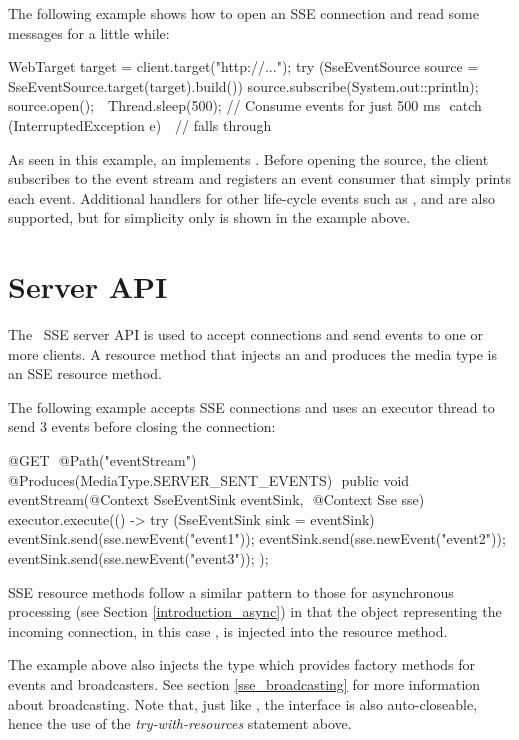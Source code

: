 The following example shows how to open an SSE connection and read some messages for a little
while:

\begin{listing}{1}
  WebTarget target = client.target("http://...");
  try (SseEventSource source = SseEventSource.target(target).build()) {
	source.subscribe(System.out::println);
	source.open();  
	Thread.sleep(500); 		// Consume events for just 500 ms 
  } catch (InterruptedException e) { 
	// falls through 
  }
\end{listing}

As seen in this example, an  implements . Before opening the source, the client subscribes to the event stream and registers an event consumer that simply prints each event. Additional handlers for other life-cycle events such as ,  and  are also supported, but for simplicity only  is shown in the example above.

\section{Server API}
\label{sse_server_api}

The \jaxrs\ SSE server API is used to accept connections and send events to one or more clients. A resource method that injects an  and produces the media type  is an SSE resource method.

The following example accepts SSE connections and uses an executor thread to send 3 events before closing the connection:

\begin{listing}{1}
@GET 
@Path("eventStream") 
@Produces(MediaType.SERVER_SENT_EVENTS) 
public void eventStream(@Context SseEventSink eventSink, 
                        @Context Sse sse) {
  executor.execute(() -> {
    try (SseEventSink sink = eventSink) {  
      eventSink.send(sse.newEvent("event1"));
      eventSink.send(sse.newEvent("event2"));
      eventSink.send(sse.newEvent("event3"));
	} 
  });
}
\end{listing}

SSE resource methods follow a similar pattern to those for asynchronous processing (see Section \ref{introduction_async}) in that the object representing the incoming connection, in this case , is injected into the resource method. 

The example above also injects the  type which provides factory methods for events and broadcasters. See section \ref{sse_broadcasting} for more information about broadcasting. Note that, just like , the interface  is also auto-closeable, hence the use of the \emph{try-with-resources} statement above.

